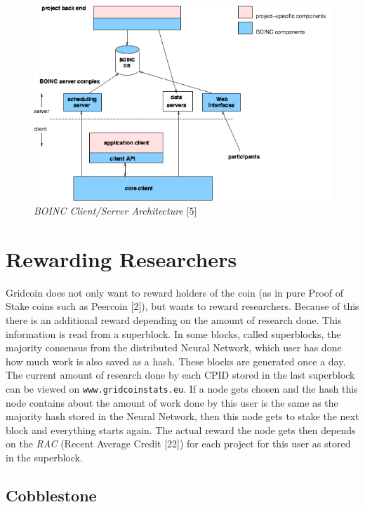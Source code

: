 \begin{figure}
\centering
\includegraphics[scale=0.5]{figures/project_boinc}
\medskip
\caption{\textit{BOINC Client/Server Architecture} [5]}
\small
\end{figure}

\section{Rewarding Researchers}

Gridcoin does not only want to reward holders of the coin (as in pure Proof of Stake coins such as Peercoin [2]), but wants to reward researchers. Because of this there is an additional reward depending on the amount of research done. This information is read from a superblock. In some blocks, called superblocks, the majority consensus from the distributed Neural Network, which user has done how much work is also saved as a hash. These blocks are generated once a day. The current amount of research done by each CPID stored in the last superblock can be viewed on \texttt{www.gridcoinstats.eu}. If a node gets chosen and the hash this node contains about the amount of work done by this user is the same as the majority hash stored in the Neural Network, then this node gets to stake the next block and everything starts again. The actual reward the node gets then depends on the \textit{RAC} (Recent Average Credit [22]) for each project for this user as stored in the superblock.\\

\subsection{Cobblestone}


